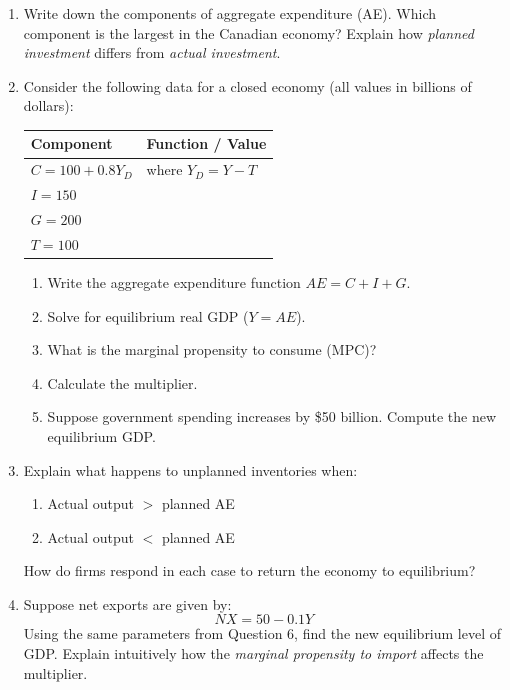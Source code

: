 \documentclass[12pt]{article}
\begin{document}
\newpage


\begin{enumerate}[label=\textbf{\arabic*.}, start=5, leftmargin=1.5em]

\item 
Write down the components of aggregate expenditure (AE). Which component is the largest in the Canadian economy? Explain how \textit{planned investment} differs from \textit{actual investment}.

\vspace{1em}

\item Consider the following data for a closed economy (all values in billions of dollars):

\begin{center}
\begin{tabular}{ll}
\toprule
\textbf{Component} & \textbf{Function / Value} \\
\midrule
$C = 100 + 0.8Y_D$ & where $Y_D = Y - T$ \\
$I = 150$ & \\
$G = 200$ & \\
$T = 100$ & \\
\bottomrule
\end{tabular}
\end{center}

\begin{enumerate}[label=(\alph*)]
\item Write the aggregate expenditure function $AE = C + I + G$.
\item Solve for equilibrium real GDP ($Y = AE$).
\item What is the marginal propensity to consume (MPC)?
\item Calculate the multiplier.
\item Suppose government spending increases by \$50 billion. Compute the new equilibrium GDP.
\end{enumerate}

\vspace{1em}

\item Explain what happens to unplanned inventories when:
\begin{enumerate}[label=(\alph*)]
\item Actual output $>$ planned AE
\item Actual output $<$ planned AE
\end{enumerate}
How do firms respond in each case to return the economy to equilibrium?

\vspace{1em}

\item Suppose net exports are given by:
\[
NX = 50 - 0.1Y
\]
Using the same parameters from Question 6, find the new equilibrium level of GDP. Explain intuitively how the \textit{marginal propensity to import} affects the multiplier.

\end{enumerate}
\end{document}
